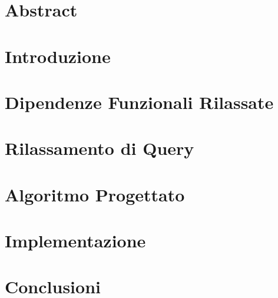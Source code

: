 \documentclass[12pt,oneside]{report}
\begin{document}
\begin{titlepage}

\end{titlepage}
\chapter*{Abstract}




\chapter{Introduzione}


\chapter{Dipendenze Funzionali Rilassate}


\chapter{Rilassamento di Query}


\chapter{Algoritmo Progettato}


\chapter{Implementazione}


\chapter{Conclusioni}


\tableofcontents
\listoftables
\renewcommand\listoflistingscaption{Elenco degli snippet di codice}
\listoflistings


\end{document}
